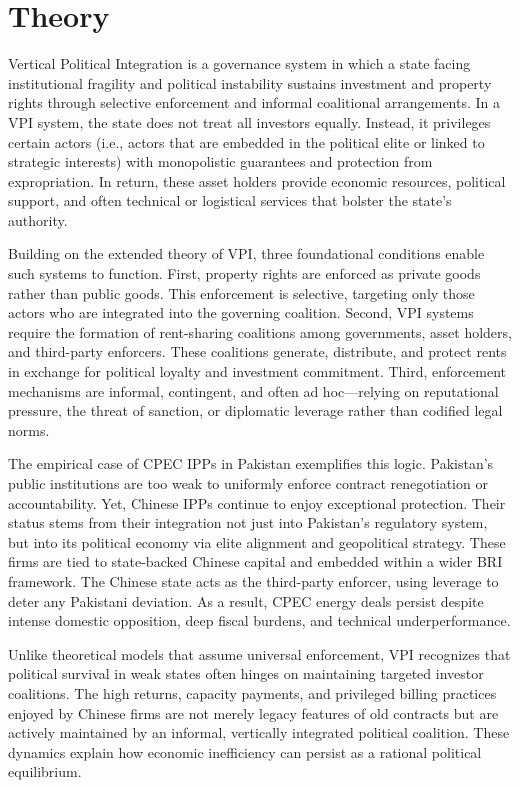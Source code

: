 \documentclass[12pt]{article}
\begin{document}
\section{Theory}
Vertical Political Integration \citep{Haber2003} is a governance system in which a state facing institutional fragility and political instability sustains investment and property rights through selective enforcement and informal coalitional arrangements. In a VPI system, the state does not treat all investors equally. Instead, it privileges certain actors (i.e., actors that are embedded in the political elite or linked to strategic interests) with monopolistic guarantees and protection from expropriation. In return, these asset holders provide economic resources, political support, and often technical or logistical services that bolster the state’s authority.

Building on the extended theory of VPI, three foundational conditions enable such systems to function. First, property rights are enforced as private goods rather than public goods. This enforcement is selective, targeting only those actors who are integrated into the governing coalition. Second, VPI systems require the formation of rent-sharing coalitions among governments, asset holders, and third-party enforcers. These coalitions generate, distribute, and protect rents in exchange for political loyalty and investment commitment. Third, enforcement mechanisms are informal, contingent, and often ad hoc---relying on reputational pressure, the threat of sanction, or diplomatic leverage rather than codified legal norms.

The empirical case of CPEC IPPs in Pakistan exemplifies this logic. Pakistan’s public institutions are too weak to uniformly enforce contract renegotiation or accountability. Yet, Chinese IPPs continue to enjoy exceptional protection. Their status stems from their integration not just into Pakistan’s regulatory system, but into its political economy via elite alignment and geopolitical strategy. These firms are tied to state-backed Chinese capital and embedded within a wider BRI framework. The Chinese state acts as the third-party enforcer, using leverage to deter any Pakistani deviation. As a result, CPEC energy deals persist despite intense domestic opposition, deep fiscal burdens, and technical underperformance.

Unlike theoretical models that assume universal enforcement, VPI recognizes that political survival in weak states often hinges on maintaining targeted investor coalitions. The high returns, capacity payments, and privileged billing practices enjoyed by Chinese firms are not merely legacy features of old contracts but are actively maintained by an informal, vertically integrated political coalition. These dynamics explain how economic inefficiency can persist as a rational political equilibrium.
\end{document}
